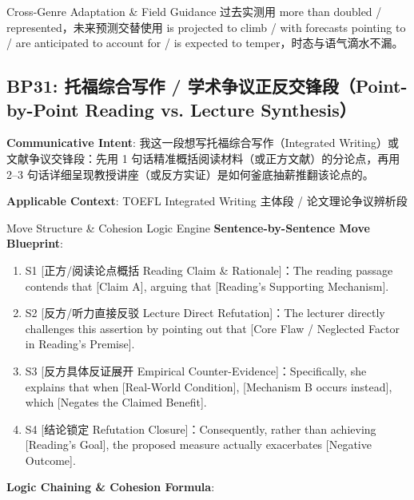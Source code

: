 \endgroup
\vspace{4pt}
\begin{TipBox}{Cross-Genre Adaptation \& Field Guidance}
过去实测用 more than doubled / represented，未来预测交替使用 is projected to climb / with forecasts pointing to / are anticipated to account for / is expected to temper，时态与语气滴水不漏。
\end{TipBox}
\vspace{8pt}
\subsection{BP31: 托福综合写作 / 学术争议正反交锋段（Point-by-Point Reading vs. Lecture Synthesis）}\label{sec:bp:BP31}
\noindent\textbf{\color{AcadNavy}Communicative Intent}: 我这一段想写托福综合写作（Integrated Writing）或文献争议交锋段：先用 1 句话精准概括阅读材料（或正方文献）的分论点，再用 2--3 句话详细呈现教授讲座（或反方实证）是如何釜底抽薪推翻该论点的。\par\vspace{2pt}
\noindent\textbf{\color{AcadSlate}Applicable Context}: TOEFL Integrated Writing 主体段 / 论文理论争议辨析段\par\vspace{4pt}
\begin{ConceptBox}{Move Structure \& Cohesion Logic Engine}
\textbf{Sentence-by-Sentence Move Blueprint}:
\begin{enumerate}[label=\textbf{\color{AcadNavy}S\arabic*.}, leftmargin=2em, itemsep=2pt]
  \item S1 [正方/阅读论点概括 Reading Claim \& Rationale]：The reading passage contends that [Claim A], arguing that [Reading's Supporting Mechanism].
  \item S2 [反方/听力直接反驳 Lecture Direct Refutation]：The lecturer directly challenges this assertion by pointing out that [Core Flaw / Neglected Factor in Reading's Premise].
  \item S3 [反方具体反证展开 Empirical Counter-Evidence]：Specifically, she explains that when [Real-World Condition], [Mechanism B occurs instead], which [Negates the Claimed Benefit].
  \item S4 [结论锁定 Refutation Closure]：Consequently, rather than achieving [Reading's Goal], the proposed measure actually exacerbates [Negative Outcome].
\end{enumerate}\par\vspace{4pt}
\textbf{Logic Chaining \& Cohesion Formula}:\par{}
\end{ConceptBox}
